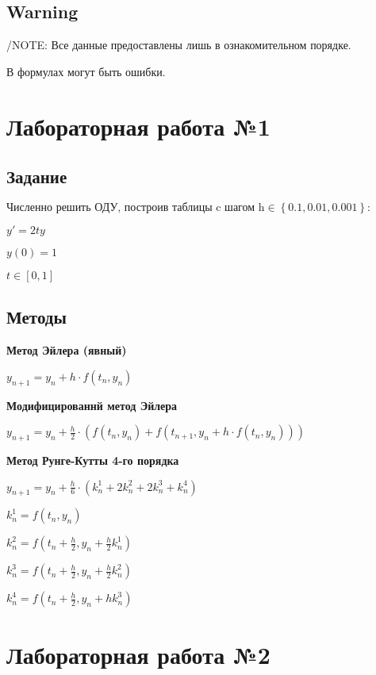 \documentclass[12pt, a4paper]{article}
\begin{document}
\subsection{Warning}

/NOTE: Все данные предоставлены лишь в ознакомительном порядке.

В формулах могут быть ошибки.




\section{Лабораторная работа №1}

\subsection{Задание}
$ \text{Численно решить ОДУ, построив таблицы c шагом h} \in \left\{ 0.1, 0.01, 0.001 \right\} : $

$ y' = 2ty $

$ y(0) = 1 $

$ t \in [0,1] $




\subsection{Методы}
\textbf{Метод Эйлера (явный)}

$ y_{n+1} = y_n + h \cdot f(t_n, y_n) $

\textbf{Модифицированнй метод Эйлера}

$ y_{n+1} = y_n + \frac{h}{2} \cdot (f(t_n, y_n) + f(t_{n+1}, y_n + h \cdot f(t_n, y_n))) $

\textbf{Метод Рунге-Кутты 4-го порядка}

$ y_{n+1} = y_n + \frac{h}{6} \cdot (k_n^1 + 2k_n^2 + 2k_n^3 + k_n^4) $

$ k_n^1 = f(t_n, y_n) $

$ k_n^2 = f(t_n + \frac{h}{2}, y_n + \frac{h}{2} k_n^1) $

$ k_n^3 = f(t_n + \frac{h}{2}, y_n + \frac{h}{2} k_n^2) $

$ k_n^4 = f(t_n + \frac{h}{2}, y_n + h k_n^3) $








\section{Лабораторная работа №2}
\end{document}
